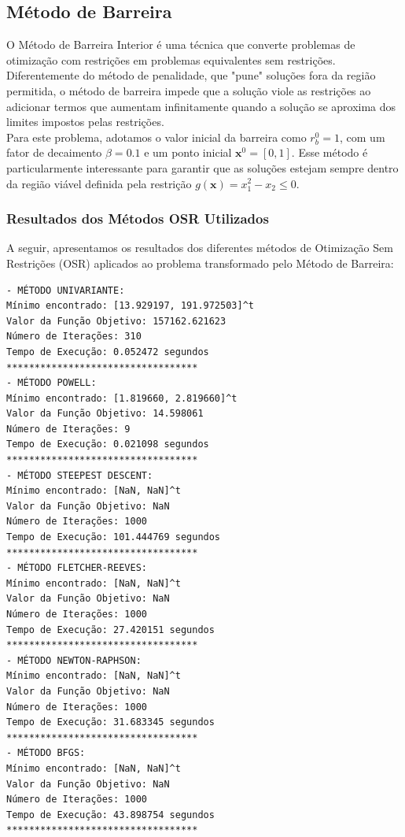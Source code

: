 \documentclass[a4paper, 12pt]{article}
\begin{document}
\subsection{Método de Barreira}

O Método de Barreira Interior é uma técnica que converte problemas de otimização com restrições em problemas equivalentes sem restrições. Diferentemente do método de penalidade, que "pune" soluções fora da região permitida, o método de barreira impede que a solução viole as restrições ao adicionar termos que aumentam infinitamente quando a solução se aproxima dos limites impostos pelas restrições.\\

Para este problema, adotamos o valor inicial da barreira como \( r_b^0 = 1 \), com um fator de decaimento \( \beta = 0.1 \) e um ponto inicial \( \mathbf{x}^0 = [0, 1] \). Esse método é particularmente interessante para garantir que as soluções estejam sempre dentro da região viável definida pela restrição \( g(\mathbf{x}) = x_1^2 - x_2 \leq 0 \).

\subsubsection{Resultados dos Métodos OSR Utilizados}

A seguir, apresentamos os resultados dos diferentes métodos de Otimização Sem Restrições (OSR) aplicados ao problema transformado pelo Método de Barreira:

\begin{verbatim}
- MÉTODO UNIVARIANTE:
Mínimo encontrado: [13.929197, 191.972503]^t
Valor da Função Objetivo: 157162.621623
Número de Iterações: 310
Tempo de Execução: 0.052472 segundos
**********************************
- MÉTODO POWELL:
Mínimo encontrado: [1.819660, 2.819660]^t
Valor da Função Objetivo: 14.598061
Número de Iterações: 9
Tempo de Execução: 0.021098 segundos
**********************************
- MÉTODO STEEPEST DESCENT:
Mínimo encontrado: [NaN, NaN]^t
Valor da Função Objetivo: NaN
Número de Iterações: 1000
Tempo de Execução: 101.444769 segundos
**********************************
- MÉTODO FLETCHER-REEVES:
Mínimo encontrado: [NaN, NaN]^t
Valor da Função Objetivo: NaN
Número de Iterações: 1000
Tempo de Execução: 27.420151 segundos
**********************************
- MÉTODO NEWTON-RAPHSON:
Mínimo encontrado: [NaN, NaN]^t
Valor da Função Objetivo: NaN
Número de Iterações: 1000
Tempo de Execução: 31.683345 segundos
**********************************
- MÉTODO BFGS:
Mínimo encontrado: [NaN, NaN]^t
Valor da Função Objetivo: NaN
Número de Iterações: 1000
Tempo de Execução: 43.898754 segundos
**********************************
\end{verbatim}
\end{document}
